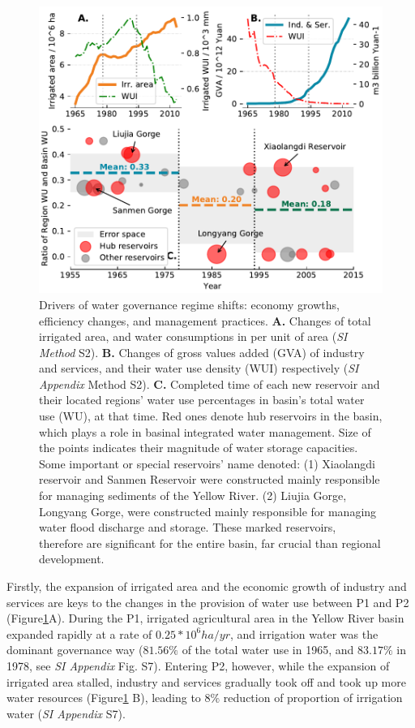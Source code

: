 \documentclass[9pt, twocolumn, twoside, lineno]{pnas-new}
\begin{document}
\begin{figure}[th!]
	\centering
	\includegraphics[width=\linewidth]{../../figures/main/causes.pdf}
	\caption{
		Drivers of water governance regime shifts: economy growths, efficiency changes, and management practices.
		\textbf{A.} Changes of total irrigated area, and water consumptions in per unit of area (\textit{SI Method} S2).
		\textbf{B.} Changes of gross values added (GVA) of industry and services, and their water use density (WUI) respectively (\textit{SI Appendix} Method S2).
		\textbf{C.} Completed time of each new reservoir and their located regions' water use percentages in basin's total water use (WU), at that time. Red ones denote hub reservoirs in the basin, which plays a role in basinal integrated water management. Size of the points indicates their magnitude of water storage capacities. Some important or special reservoirs' name denoted: (1) Xiaolangdi reservoir and Sanmen Reservoir were constructed mainly responsible for managing sediments of the Yellow River. (2) Liujia Gorge, Longyang Gorge, were constructed mainly responsible for managing water flood discharge and storage. These marked reservoirs, therefore are significant for the entire basin, far crucial than regional development.
	}
	\label{fig:Causes}
\end{figure}

Firstly, the expansion of irrigated area and the economic growth of industry and services are keys to the changes in the provision of water use between P1 and P2 (Figure\ref{fig:Causes}A). During the P1, irrigated agricultural area in the Yellow River basin expanded rapidly at a rate of $0.25*10^6 ha/yr$, and irrigation water was the dominant governance way ($81.56\%$ of the total water use in 1965, and $83.17\%$ in 1978, see \textit{SI Appendix} Fig. S7). Entering P2, however, while the expansion of irrigated area stalled, industry and services gradually took off and took up more water resources (Figure\ref{fig:Causes} B), leading to $8\%$ reduction of proportion of irrigation water (\textit{SI Appendix} S7).
\end{document}
